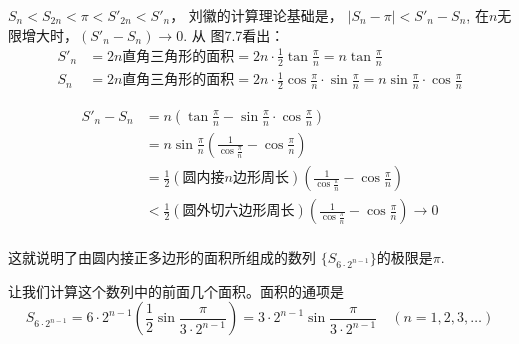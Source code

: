 $S_n<S_{2n}<\pi<S'_{2n}<S'_n$， 
刘徽的计算理论基础是，
$|S_n-\pi|<S'_n-S_n$, 在$n$无限增大时，$(S'_n-S_n)\to 0$. 从
图7.7看出：
\[\begin{split}
    S'_n&=2n\text{直角三角形的面积}=2n\cdot \frac{1}{2}\tan\frac{\pi}{n}=n\tan\frac{\pi}{n}   \\
    S_n&=2n\text{直角三角形的面积}=2n\cdot \frac{1}{2}\cos\frac{\pi}{n}\cdot \sin \frac{\pi}{n}=n\sin\frac{\pi}{n}\cdot \cos\frac{\pi}{n}
\end{split}\]

\[\begin{split}
    S'_n-S_n &= n\left(\tan\frac{\pi}{n}-\sin\frac{\pi}{n}\cdot \cos\frac{\pi}{n}\right)\\
    &=n \sin\frac{\pi}{n}\left(\frac{1}{\cos\frac{\pi}{n}}-\cos\frac{\pi}{n}\right)\\
    &=\frac{1}{2}(\text{圆内接$n$边形周长})\left(\frac{1}{\cos\frac{\pi}{n}}-\cos\frac{\pi}{n}\right)\\
    &<\frac{1}{2}(\text{圆外切六边形周长})\left(\frac{1}{\cos\frac{\pi}{n}}-\cos\frac{\pi}{n}\right)\to 0\\
\end{split} \]

这就说明了由圆内接正多边形的面积所组成的数列
$\{S_{6\cdot 2^{n-1}}\}$的极限是$\pi$. 

让我们计算这个数列中的前面几个面积。面积的通项是
\[S_{6\cdot 2^{n-1}}=6\cdot 2^{n-1}\left(\frac{1}{2}\sin\frac{\pi}{3\cdot 2^{n-1}}\right)=3\cdot 2^{n-1}\sin\frac{\pi}{3\cdot 2^{n-1}}\quad (n=1,2,3,\ldots)\]

